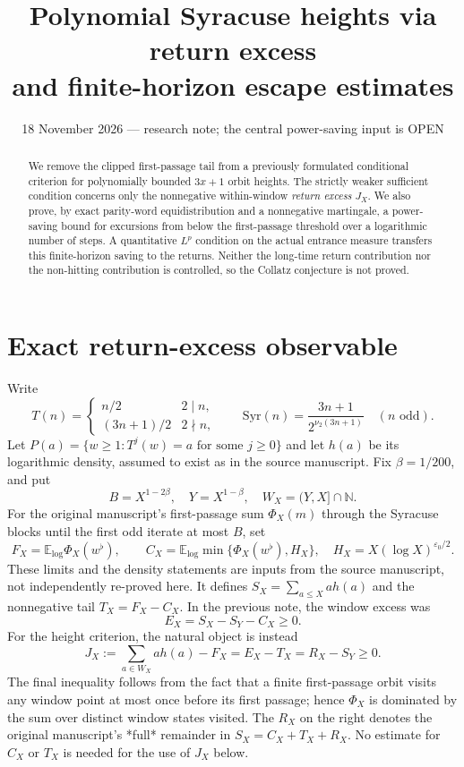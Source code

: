 \documentclass[11pt]{amsart}
\title[Polynomial Syracuse heights via return excess]{Polynomial Syracuse heights via return excess\\and finite-horizon escape estimates}
\date{18 November 2026 --- research note; the central power-saving input is OPEN}
\theoremstyle{remark}\newtheorem{remark}{Remark}
\newcommand{\N}{\mathbb N}
\newcommand{\Elog}{\mathbb E_{\mathrm{log}}}
\begin{document}
\begin{abstract}
We remove the clipped first-passage tail from a previously formulated conditional criterion for polynomially bounded $3x+1$ orbit heights.  The strictly weaker sufficient condition concerns only the nonnegative within-window \emph{return excess} $J_X$.  We also prove, by exact parity-word equidistribution and a nonnegative martingale, a power-saving bound for excursions from below the first-passage threshold over a logarithmic number of steps.  A quantitative $L^p$ condition on the actual entrance measure transfers this finite-horizon saving to the returns.  Neither the long-time return contribution nor the non-hitting contribution is controlled, so the Collatz conjecture is not proved.
\end{abstract}
\maketitle

\section{Exact return-excess observable}
Write
\[
 T(n)=\begin{cases}n/2&2\mid n,\\(3n+1)/2&2\nmid n,\end{cases}
 \qquad \mathrm{Syr}(n)=\frac{3n+1}{2^{\nu_2(3n+1)}}\quad(n\text{ odd}).
\]
Let $P(a)=\{w\ge1:T^j(w)=a\text{ for some }j\ge0\}$ and let $h(a)$ be its logarithmic density, assumed to exist as in the source manuscript. Fix $\beta=1/200$, and put
\[
 B= X^{1-2\beta},\quad Y=X^{1-\beta},\quad W_X=(Y,X]\cap\N.
\]
For the original manuscript's first-passage sum $\Phi_X(m)$ through the Syracuse blocks until the first odd iterate at most $B$, set
\[
 F_X=\Elog\Phi_X(w^\flat),\qquad
 C_X=\Elog\min\{\Phi_X(w^\flat),H_X\},\quad H_X=X(\log X)^{\varepsilon_0/2}.
\]
These limits and the density statements are inputs from the source manuscript, not independently re-proved here.  It defines $S_X=\sum_{a\le X}a h(a)$ and the nonnegative tail $T_X=F_X-C_X$.  In the previous note, the window excess was
\[
 E_X=S_X-S_Y-C_X\ge0.
\]
For the height criterion, the natural object is instead
\begin{equation}\label{eq:J}
 \boxed{J_X:=\sum_{a\in W_X}a h(a)-F_X=E_X-T_X=R_X-S_Y\ge0.}
\end{equation}
The final inequality follows from the fact that a finite first-passage orbit visits any window point at most once before its first passage; hence $\Phi_X$ is dominated by the sum over distinct window states visited.  The $R_X$ on the right denotes the original manuscript's *full* remainder in $S_X=C_X+T_X+R_X$.  No estimate for $C_X$ or $T_X$ is needed for the use of $J_X$ below.
\end{document}
